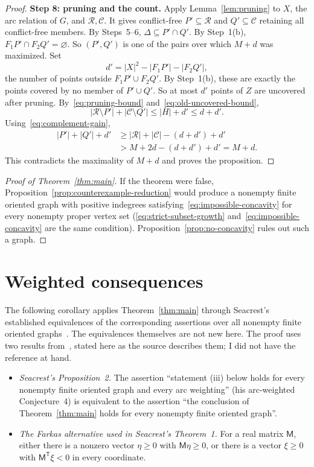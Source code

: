 \documentclass[11pt]{article}
\theoremstyle{remark}
\newcommand{\abs}[1]{\lvert #1\rvert}
\newcommand{\step}[1]{\par\medskip\noindent\textbf{#1}\enspace}
\begin{document}
\begin{proof}
\step{Step 8: pruning and the count.}
Apply Lemma~\ref{lem:pruning} to $X$, the arc relation of $G$, and
$\mathcal R,\mathcal C$.  It gives conflict-free
$P'\subseteq\mathcal R$ and $Q'\subseteq\mathcal C$ retaining all
conflict-free members.  By Steps~5--6, $\Delta\subseteq P'\cap Q'$.
By Step~1(b), $F_1P'\cap F_2Q'=\varnothing$.  So $(P',Q')$ is one of the
pairs over which $M+d$ was maximized.  Set
\[
 d'=\abs{X}^2-\abs{F_1P'}-\abs{F_2Q'},
\]
the number of points outside $F_1P'\cup F_2Q'$.  By Step~1(b), these are
exactly the points covered by no member of $P'\cup Q'$.  So at most $d'$
points of $Z$ are uncovered after pruning.
By~\eqref{eq:pruning-bound} and~\eqref{eq:old-uncovered-bound},
\[
 \abs{\mathcal R\setminus P'}+\abs{\mathcal C\setminus Q'}\le\abs H+d'
 \le d+d'.
\]
Using~\eqref{eq:complement-gain},
\[
 \begin{aligned}
 \abs{P'}+\abs{Q'}+d'
 &\ge \abs{\mathcal R}+\abs{\mathcal C}-(d+d')+d'\\
 &>M+2d-(d+d')+d'=M+d.
 \end{aligned}
\]
This contradicts the maximality of $M+d$ and proves the proposition.
\end{proof}

\begin{proof}[Proof of Theorem~\ref{thm:main}]
If the theorem were false, Proposition~\ref{prop:counterexample-reduction}
would produce a nonempty finite oriented graph with positive indegrees
satisfying~\eqref{eq:impossible-concavity} for every nonempty proper vertex
set (\eqref{eq:strict-subset-growth} and~\eqref{eq:impossible-concavity} are
the same condition).  Proposition~\ref{prop:no-concavity} rules out such a
graph.
\end{proof}

\section{Weighted consequences}\label{sec:weighted-consequences}

The following corollary applies Theorem~\ref{thm:main} through Seacrest's
established equivalences of the corresponding assertions over all nonempty
finite oriented graphs~\cite{Seacrest2015}.  The equivalences themselves are
not new here.  The proof uses two results from~\cite{Seacrest2015}, stated
here as the source describes them; I did not have the reference at hand.
\begin{itemize}[nosep]
\item \emph{Seacrest's Proposition~2.}  The assertion ``statement
 \textup{(iii)} below holds for every nonempty finite oriented graph and
 every arc weighting'' (his arc-weighted Conjecture~4) is equivalent to the
 assertion ``the conclusion of Theorem~\ref{thm:main} holds for every
 nonempty finite oriented graph''.
\item \emph{The Farkas alternative used in Seacrest's Theorem~1.}  For a real
 matrix $\mathsf M$, either there is a nonzero vector $\eta\ge0$ with
 $\mathsf M\eta\ge0$, or there is a vector $\xi\ge0$ with
 $\mathsf M^{\mathsf T}\xi<0$ in every coordinate.
\end{itemize}
\end{document}
